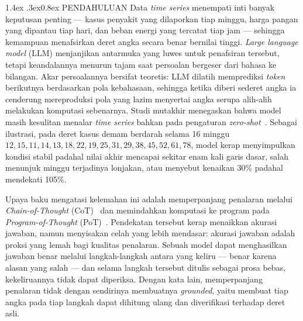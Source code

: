 \documentclass[10pt,a4paper,twocolumn]{article}
\makeatletter
\renewcommand\section{\@startsection{section}{1}{\z@}%
  {1.4ex \@plus .3ex}{0.8ex}%
  {\normalfont\small\bfseries}}
\makeatother
\begin{document}
\justifying

\section{PENDAHULUAN}
Data \textit{time series} menempati inti banyak keputusan penting --- kasus
penyakit yang dilaporkan tiap minggu, harga pangan yang dipantau tiap hari, dan
beban energi yang tercatat tiap jam --- sehingga kemampuan menafsirkan deret
angka secara benar bernilai tinggi. \textit{Large language model} (LLM)
menjanjikan antarmuka yang luwes untuk penafsiran tersebut, tetapi keandalannya
menurun tajam saat persoalan bergeser dari bahasa ke bilangan. Akar persoalannya
bersifat teoretis: LLM dilatih memprediksi \textit{token} berikutnya berdasarkan
pola kebahasaan, sehingga ketika diberi sederet angka ia cenderung mereproduksi
pola yang lazim menyertai angka serupa alih-alih melakukan komputasi sebenarnya.
Studi mutakhir menegaskan bahwa model masih kesulitan menalar \textit{time
series} bahkan pada pengaturan \textit{zero-shot}~\cite{merrill2024,mtbench2025}.
Sebagai ilustrasi, pada deret kasus demam berdarah selama 16 minggu $12, 15, 11,
14, 13, 18, 22, 19, 25, 31, 29, 38, 45, 52, 61, 78$, model kerap menyimpulkan
kondisi stabil padahal nilai akhir mencapai sekitar enam kali garis dasar, salah
menunjuk minggu terjadinya lonjakan, atau menyebut kenaikan 30\% padahal
mendekati 105\%.

Upaya baku mengatasi kelemahan ini adalah memperpanjang penalaran melalui
\textit{Chain-of-Thought} (CoT)~\cite{cot2022} dan memindahkan komputasi ke
program pada \textit{Program-of-Thought} (PoT)~\cite{pal2023}. Pendekatan tersebut
kerap menaikkan akurasi jawaban, namun menyisakan celah yang lebih mendasar:
akurasi jawaban adalah proksi yang lemah bagi kualitas penalaran. Sebuah model
dapat menghasilkan jawaban benar melalui langkah-langkah antara yang keliru ---
benar karena alasan yang salah --- dan selama langkah tersebut ditulis sebagai
prosa bebas, kekeliruannya tidak dapat diperiksa. Dengan kata lain, memperpanjang
penalaran tidak dengan sendirinya membuatnya \textit{grounded}, yaitu membuat tiap
angka pada tiap langkah dapat dihitung ulang dan diverifikasi terhadap deret asli.
\end{document}
